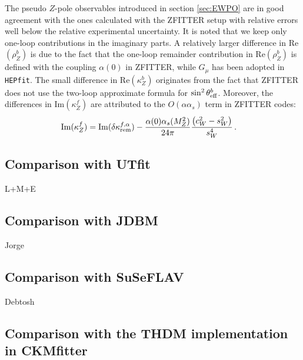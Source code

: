 \documentclass[preprint,3p,12pt]{elsarticle}
\newcommand{\HEPfit}{\texttt{HEPfit}\xspace}
\newcommand{\satoshisnotes}[1]{{\color{blue}  #1}}
\begin{document}
\satoshisnotes{%
The pseudo $Z$-pole observables introduced in section \ref{sec:EWPO} are in good agreement with the ones calculated with the ZFITTER setup \cite{Bardin:1992jc,Bardin:1999yd,Arbuzov:2005ma,Akhundov:2013ons} with relative errors well below the relative experimental uncertainty.
It is noted that we keep only one-loop contributions in the imaginary
parts. A relatively larger difference in Re$(\rho_Z^b)$ is due to the
fact that the one-loop remainder contribution in Re$(\rho_Z^b)$ is
defined with the coupling $\alpha(0)$ in ZFITTER, while 
$G_\mu$ has been adopted in \HEPfit.
The small difference in Re$(\kappa_Z^b)$ originates from the
fact that ZFITTER does not use the two-loop approximate formula for 
$\sin^2\theta_{\rm eff}^b$. Moreover, 
the differences in Im$(\kappa_Z^f)$ are attributed
to the $O(\alpha\alpha_s)$ term in ZFITTER codes: 
\begin{align}
{\rm Im}(\kappa_Z^f) &= 
{\rm Im}(\delta\kappa_{\rm rem}^{f,\alpha})
- \frac{\alpha(0)\alpha_s(M_Z^2)}{24\pi}
  \frac{\left( c_W^2- s_W^2 \right)}{s_W^4}\,. 
\end{align}

}%

\subsection{Comparison with UTfit}
\label{sec:UTfit}

L+M+E

\subsection{Comparison with JDBM}
\label{sec:JDBM}

Jorge

\subsection{Comparison with SuSeFLAV}
\label{sec:Debtosh}

Debtosh

\subsection{Comparison with the THDM implementation in CKMfitter}
\label{sec:CKMfitter}
\end{document}
